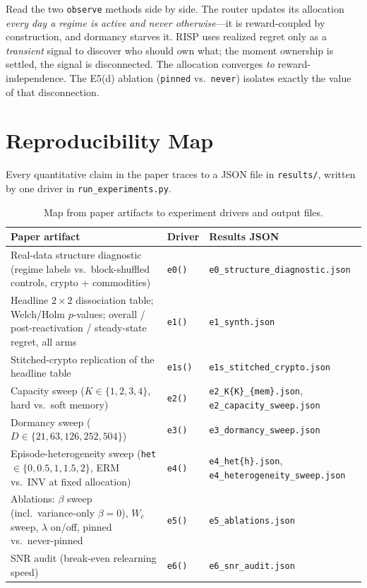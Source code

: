 \documentclass[11pt,a4paper]{article}
\theoremstyle{definition}
\theoremstyle{plain}
\begin{document}
\begin{intuition}
Read the two \texttt{observe} methods side by side. The router updates its
allocation \emph{every day a regime is active and never otherwise}---it is
reward-coupled by construction, and dormancy starves it. RISP uses
realized regret only as a \emph{transient} signal to discover who should own
what; the moment ownership is settled, the signal is disconnected. The
allocation converges \emph{to} reward-independence. The E5(d) ablation
(\texttt{pinned} vs.\ \texttt{never}) isolates exactly the value of that
disconnection.
\end{intuition}


\section{Reproducibility Map}
\label{sec:dd6-repro}

Every quantitative claim in the paper traces to a JSON file in
\texttt{results/}, written by one driver in \texttt{run\_experiments.py}.

\begin{table}[h]
\centering
\small
\begin{tabular}{p{4.6cm} l l}
\hline
\textbf{Paper artifact} & \textbf{Driver} & \textbf{Results JSON} \\
\hline
Real-data structure diagnostic (regime labels vs.\ block-shuffled controls,
crypto + commodities) & \texttt{e0()} & \texttt{e0\_structure\_diagnostic.json} \\
Headline $2{\times}2$ dissociation table; Welch/Holm $p$-values; overall /
post-reactivation / steady-state regret, all arms & \texttt{e1()} &
\texttt{e1\_synth.json} \\
Stitched-crypto replication of the headline table & \texttt{e1s()} &
\texttt{e1s\_stitched\_crypto.json} \\
Capacity sweep ($K \in \{1,2,3,4\}$, hard vs.\ soft memory) & \texttt{e2()}
& \texttt{e2\_K\{K\}\_\{mem\}.json}, \texttt{e2\_capacity\_sweep.json} \\
Dormancy sweep ($D \in \{21, 63, 126, 252, 504\}$) & \texttt{e3()} &
\texttt{e3\_dormancy\_sweep.json} \\
Episode-heterogeneity sweep (\texttt{het} $\in \{0, 0.5, 1, 1.5, 2\}$, ERM
vs.\ INV at fixed allocation) & \texttt{e4()} &
\texttt{e4\_het\{h\}.json}, \texttt{e4\_heterogeneity\_sweep.json} \\
Ablations: $\beta$ sweep (incl.\ variance-only $\beta{=}0$), $W_c$ sweep,
$\lambda$ on/off, pinned vs.\ never-pinned & \texttt{e5()} &
\texttt{e5\_ablations.json} \\
SNR audit (break-even relearning speed) & \texttt{e6()} &
\texttt{e6\_snr\_audit.json} \\
\hline
\end{tabular}
\caption{Map from paper artifacts to experiment drivers and output files.}
\label{tab:dd6-repromap}
\end{table}
\end{document}

